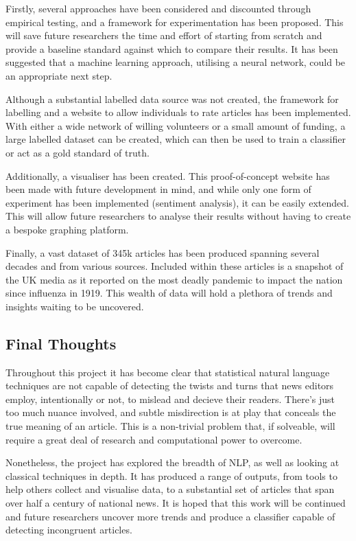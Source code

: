 Firstly, several approaches have been considered and discounted through empirical testing, and a framework for experimentation has been proposed. This will save future researchers the time and effort of starting from scratch and provide a baseline standard against which to compare their results. It has been suggested that a machine learning approach, utilising a neural network, could be an appropriate next step.

Although a substantial labelled data source was not created, the framework for labelling and a website to allow individuals to rate articles has been implemented. With either a wide network of willing volunteers or a small amount of funding, a large labelled dataset can be created, which can then be used to train a classifier or act as a gold standard of truth.

Additionally, a visualiser has been created. This proof-of-concept website has been made with future development in mind, and while only one form of experiment has been implemented (sentiment analysis), it can be easily extended. This will allow future researchers to analyse their results without having to create a bespoke graphing platform. 

Finally, a vast dataset of 345k articles has been produced spanning several decades and from various sources. Included within these articles is a snapshot of the UK media as it reported on the most deadly pandemic to impact the nation since influenza in 1919. This wealth of data will hold a plethora of trends and insights waiting to be uncovered.


\subsection{Final Thoughts}

Throughout this project it has become clear that statistical natural language techniques are not capable of detecting the twists and turns that news editors employ, intentionally or not, to mislead and decieve their readers. There's just too much nuance involved, and subtle misdirection is at play that conceals the true meaning of an article. This is a non-trivial problem that, if solveable, will require a great deal of research and computational power to overcome.

Nonetheless, the project has explored the breadth of NLP, as well as looking at classical techniques in depth. It has produced a range of outputs, from tools to help others collect and visualise data, to a substantial set of articles that span over half a century of national news. It is hoped that this work will be continued and future researchers uncover more trends and produce a classifier capable of detecting incongruent articles.
